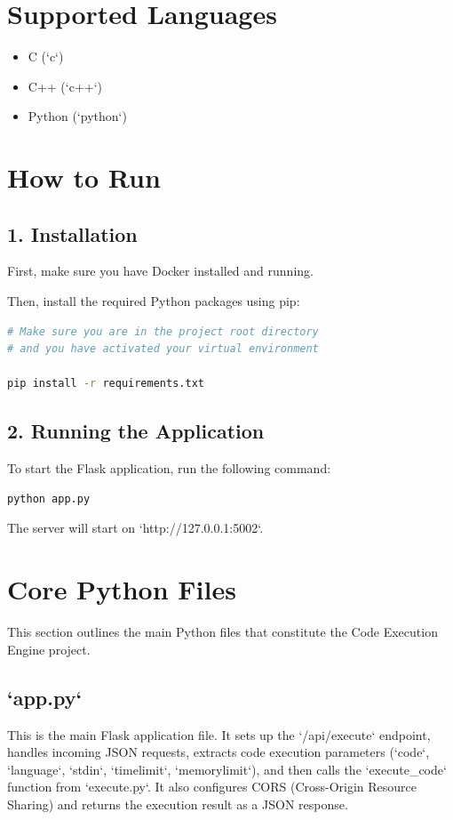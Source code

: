 \documentclass{article}
\begin{document}
\section*{Supported Languages}
\begin{itemize}
    \item C (`c`)
    \item C++ (`c++`)
    \item Python (`python`)
\end{itemize}


\section*{How to Run}

\subsection*{1. Installation}
First, make sure you have Docker installed and running.

Then, install the required Python packages using pip:
\begin{lstlisting}[language=bash, caption=Installation Command]
# Make sure you are in the project root directory
# and you have activated your virtual environment

pip install -r requirements.txt
\end{lstlisting}

\subsection*{2. Running the Application}
To start the Flask application, run the following command:
\begin{lstlisting}[language=bash, caption=Run Application Command]
python app.py
\end{lstlisting}
The server will start on `http://127.0.0.1:5002`.

\section*{Core Python Files}

This section outlines the main Python files that constitute the Code Execution Engine project.

\subsection*{`app.py`}
This is the main Flask application file. It sets up the `/api/execute` endpoint, handles incoming JSON requests, extracts code execution parameters (`code`, `language`, `stdin`, `timelimit`, `memorylimit`), and then calls the `execute\_code` function from `execute.py`. It also configures CORS (Cross-Origin Resource Sharing) and returns the execution result as a JSON response.
\end{document}
